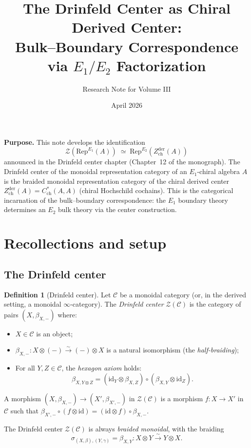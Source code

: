 \documentclass[11pt]{article}
\title{The Drinfeld Center as Chiral Derived Center:\\
\large Bulk--Boundary Correspondence via $E_1/E_2$ Factorization}
\author{Research Note for Volume III}
\date{April 2026}
\theoremstyle{definition}
\newtheorem{definition}[theorem]{Definition}
\theoremstyle{remark}
\newcommand{\Rep}{\mathrm{Rep}}
\newcommand{\id}{\mathrm{id}}
\newcommand{\cC}{\mathcal{C}}
\newcommand{\cZ}{\mathcal{Z}}
\newcommand{\Zder}{Z^{\mathrm{der}}_{\mathrm{ch}}}
\begin{document}
\maketitle

\tableofcontents

\bigskip
\noindent
\textbf{Purpose.} This note develops the identification
\[
 \cZ(\Rep^{E_1}(A)) \;\simeq\; \Rep^{E_2}(\Zder(A))
\]
announced in the Drinfeld center chapter (Chapter~12 of the monograph). The Drinfeld center of the monoidal representation category of an $E_1$-chiral algebra $A$ is the braided monoidal representation category of the chiral derived center $\Zder(A) = C^*_{\mathrm{ch}}(A,A)$ (chiral Hochschild cochains). This is the categorical incarnation of the bulk--boundary correspondence: the $E_1$ boundary theory determines an $E_2$ bulk theory via the center construction.


\section{Recollections and setup}
\label{sec:recollections}

\subsection{The Drinfeld center}

\begin{definition}[Drinfeld center]
\label{def:drinfeld-center-note}
Let $\cC$ be a monoidal category (or, in the derived setting, a monoidal $\infty$-category). The \emph{Drinfeld center} $\cZ(\cC)$ is the category of pairs $(X, \beta_{X,-})$ where:
\begin{itemize}
 \item $X \in \cC$ is an object;
 \item $\beta_{X,-} \colon X \otimes (-) \xrightarrow{\sim} (-) \otimes X$ is a natural isomorphism (the \emph{half-braiding});
 \item For all $Y, Z \in \cC$, the \emph{hexagon axiom} holds:
 \[
 \beta_{X, Y \otimes Z} = (\id_Y \otimes \beta_{X,Z}) \circ (\beta_{X,Y} \otimes \id_Z).
 \]
\end{itemize}
A morphism $(X, \beta_{X,-}) \to (X', \beta_{X',-})$ in $\cZ(\cC)$ is a morphism $f \colon X \to X'$ in $\cC$ such that $\beta_{X',-} \circ (f \otimes \id) = (\id \otimes f) \circ \beta_{X,-}$.

The Drinfeld center $\cZ(\cC)$ is always \emph{braided monoidal}, with the braiding
\[
 \sigma_{(X, \beta), (Y, \gamma)} = \beta_{X,Y} \colon X \otimes Y \xrightarrow{\sim} Y \otimes X.
\]
\end{definition}
\end{document}
